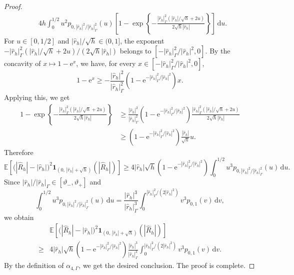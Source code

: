 \documentclass[aap]{imsart}
\theoremstyle{plain}
\theoremstyle{definition}
\begin{document}
\begin{proof}
	\[
	\begin{aligned}
		&4h
		\int_0^{1/2}
		u^2
		p_{0,|\hat r_h|^2/|\hat r_h|_\Gamma^2}(u)
		\left[
		1-
		\exp\left\{
		-\frac{|\hat r_h|_\Gamma^2(|\hat r_h|/\sqrt h+2u)}{2\sqrt h|\hat r_h|}
		\right\}
		\right]
		\,\mathrm du .
	\end{aligned}
	\]
	For \(u\in[0,1/2]\) and \(|\hat r_h|/\sqrt h\in(0,1]\), the exponent \(-|\hat r_h|_\Gamma^2(|\hat r_h|/\sqrt h+2u)/(2\sqrt h|\hat r_h|)\) belongs to \([-|\hat r_h|_\Gamma^2/|\hat r_h|^2, 0]\). By the concavity of \(x\mapsto1-\mathrm e^x\), we have, for every
	\(x\in[-|\hat r_h|_\Gamma^2/|\hat r_h|^2,0]\),
	\[
	1-\mathrm e^x
	\geqslant
	-\frac{|\hat r_h|^2}{|\hat r_h|_\Gamma^2}
	\left(1-\mathrm e^{-|\hat r_h|_\Gamma^2/|\hat r_h|^2}\right)x .
	\]
	Applying this, we get
	\[
	\begin{aligned}
		1-
		\exp\left\{
		-\frac{|\hat r_h|_\Gamma^2(|\hat r_h|/\sqrt h+2u)}{2\sqrt h|\hat r_h|}\right\}
		&\geqslant\frac{|\hat r_h|^2}{|\hat r_h|_\Gamma^2}
		\left(1-\mathrm e^{-|\hat r_h|_\Gamma^2/|\hat r_h|^2}\right)
		\frac{|\hat r_h|_\Gamma^2(|\hat r_h|/\sqrt h+2u)}{2\sqrt h|\hat r_h|}    \\
		&\geqslant 
		\left(1-\mathrm e^{-|\hat r_h|_\Gamma^2/|\hat r_h|^2}\right)
		\frac{|\hat r_h|}{\sqrt{h}}u .
	\end{aligned}
	\]
	Therefore
	\[\mathbb E\left[
		\bigl(|\hat R_h|-|\hat r_h|\bigr)^2
		\mathbf 1_{(0,\,|\hat r_h|+\sqrt h)}
		(|\hat R_h|)
		\right]\geqslant
		4|\hat r_h|\sqrt h
		\left(1-\mathrm e^{-|\hat r_h|_\Gamma^2/|\hat r_h|^2}\right)
		\int_0^{1/2}
		u^3
		p_{0,|\hat r_h|^2/|\hat r_h|_\Gamma^2}(u)\,\mathrm du .\]
	Since \(|\hat r_h|/|\hat r_h|_\Gamma\in[\vartheta_-,\vartheta_+]\) and
	\[\int_0^{1/2}
	u^3p_{0,|\hat r_h|^2/|\hat r_h|_\Gamma^2}(u)\,\mathrm du
	=\frac{|\hat r_h|^3}{|\hat r_h|_\Gamma^3}
	\int_0^{|\hat r_h|_\Gamma^2/(2|\hat r_h|^2)}
	v^3p_{0,1}(v)\,\mathrm dv ,\]
	we obtain
	\[\begin{aligned}
		&\mathbb E\left[
		\bigl(|\hat R_h|-|\hat r_h|\bigr)^2
		\mathbf 1_{(0,\,|\hat r_h|+\sqrt h)}
		(|\hat R_h|)
		\right] \\
		\geqslant&
		4|\hat r_h|\sqrt h
		\left(1-\mathrm e^{-|\hat r_h|_\Gamma^2/|\hat r_h|^2}\right)
		\frac{|\hat r_h|^3}{|\hat r_h|_\Gamma^3}
		\int_0^{|\hat r_h|_\Gamma^2/(2|\hat r_h|^2)}
		v^3p_{0,1}(v)\,\mathrm dv.
	\end{aligned}\]
By the definition of \(\alpha_{4,\Gamma}\), we get the desired conclusion. The proof is complete.
\end{proof}
			
\end{document}
